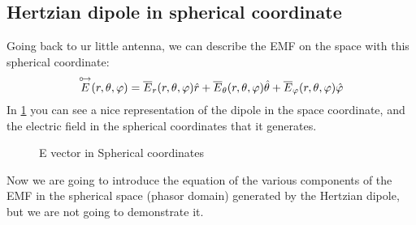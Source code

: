 \subsection*{Hertzian dipole in spherical coordinate}
Going back to ur little antenna, we can describe the EMF on the space with this spherical coordinate:
\begin{equation}
    \overset{\mathbin {{\circ \mkern-2.5mu\rightarrow}}}{E}(r,\theta,\varphi)=\overline{E}_r(r,\theta,\varphi)\hat{r}+\overline{E}_\theta(r,\theta,\varphi)\hat{\theta}+\overline{E}_\varphi(r,\theta,\varphi)\hat{\varphi}
\end{equation}
In \cref{fig:E_in_3d_radial} you can see a nice representation of the dipole in the space coordinate, and the electric field in the spherical coordinates that it generates.
\begin{figure}[H]
    \begin{center}
    \end{center} \caption{E vector in Spherical coordinates}\label{fig:E_in_3d_radial} 
\end{figure}
Now we are going to introduce the equation of the various components of the EMF in the spherical space (phasor domain) generated by the Hertzian dipole, but we are not going to demonstrate it.
